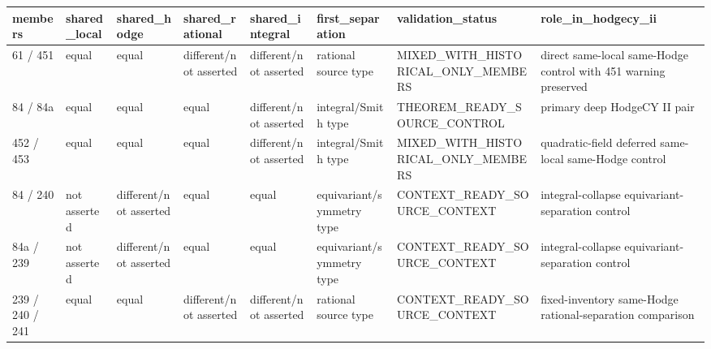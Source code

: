 \begin{tabular}{llllllll}
\hline
members & shared\_local & shared\_hodge & shared\_rational & shared\_integral & first\_separation & validation\_status & role\_in\_hodgecy\_ii \\
\hline
61 / 451 & equal & equal & different/not asserted & different/not asserted & rational source type & MIXED\_WITH\_HISTORICAL\_ONLY\_MEMBERS & direct same-local same-Hodge control with 451 warning preserved \\
84 / 84a & equal & equal & equal & different/not asserted & integral/Smith type & THEOREM\_READY\_SOURCE\_CONTROL & primary deep HodgeCY II pair \\
452 / 453 & equal & equal & equal & different/not asserted & integral/Smith type & MIXED\_WITH\_HISTORICAL\_ONLY\_MEMBERS & quadratic-field deferred same-local same-Hodge control \\
84 / 240 & not asserted & different/not asserted & equal & equal & equivariant/symmetry type & CONTEXT\_READY\_SOURCE\_CONTEXT & integral-collapse equivariant-separation control \\
84a / 239 & not asserted & different/not asserted & equal & equal & equivariant/symmetry type & CONTEXT\_READY\_SOURCE\_CONTEXT & integral-collapse equivariant-separation control \\
239 / 240 / 241 & equal & equal & different/not asserted & different/not asserted & rational source type & CONTEXT\_READY\_SOURCE\_CONTEXT & fixed-inventory same-Hodge rational-separation comparison \\
\hline
\end{tabular}
